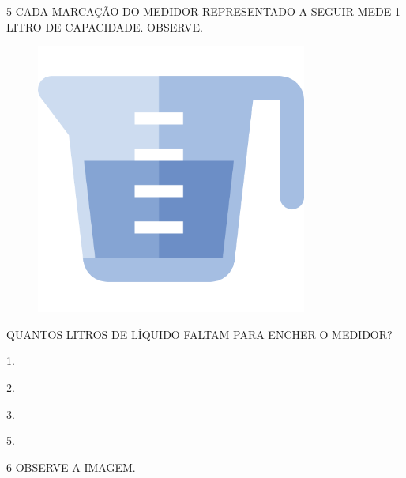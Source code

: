 \num{5} CADA MARCAÇÃO DO MEDIDOR REPRESENTADO A SEGUIR MEDE 1 LITRO DE CAPACIDADE. OBSERVE.


\begin{figure}[H]
\centering
\includegraphics[width=.9\textwidth]{media/image113.png}
\end{figure}

QUANTOS LITROS DE LÍQUIDO FALTAM PARA ENCHER O MEDIDOR?

\begin{escolha}[itemsep=0pt]
\item 1.

\item 2.

\item 3.

\item 5.
\end{escolha}

\num{6} OBSERVE A IMAGEM.


